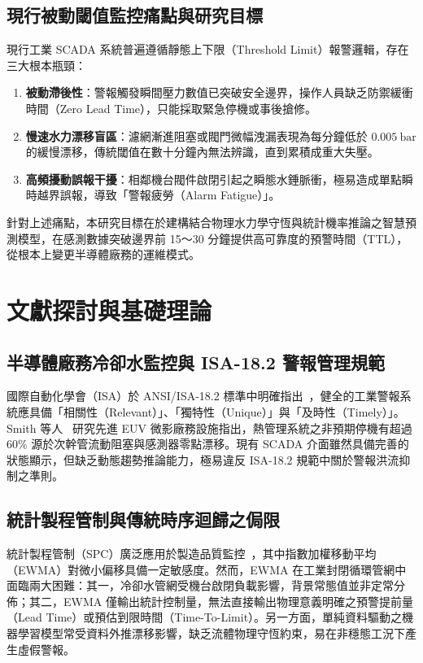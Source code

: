 \documentclass[fontset=none, a4paper, 12pt]{ctexart}
\begin{document}
\begin{doublespace}
\subsection{現行被動閾值監控痛點與研究目標}
現行工業 SCADA 系統普遍遵循靜態上下限（Threshold Limit）報警邏輯，存在三大根本瓶頸：
\begin{enumerate}
    \item \textbf{被動滯後性}：警報觸發瞬間壓力數值已突破安全邊界，操作人員缺乏防禦緩衝時間（Zero Lead Time），只能採取緊急停機或事後搶修。
    \item \textbf{慢速水力漂移盲區}：濾網漸進阻塞或閥門微幅洩漏表現為每分鐘低於 $0.005\ \mathrm{bar}$ 的緩慢漂移，傳統閾值在數十分鐘內無法辨識，直到累積成重大失壓。
    \item \textbf{高頻擾動誤報干擾}：相鄰機台閥件啟閉引起之瞬態水錘脈衝，極易造成單點瞬時越界誤報，導致「警報疲勞（Alarm Fatigue）」。
\end{enumerate}
針對上述痛點，本研究目標在於建構結合物理水力學守恆與統計機率推論之智慧預測模型，在感測數據突破邊界前 15～30 分鐘提供高可靠度的預警時間（TTL），從根本上變更半導體廠務的運維模式。

\clearpage
\section{文獻探討與基礎理論}

\subsection{半導體廠務冷卻水監控與 ISA-18.2 警報管理規範}
國際自動化學會（ISA）於 ANSI/ISA-18.2 標準中明確指出~\cite{isa1822016}，健全的工業警報系統應具備「相關性（Relevant）」、「獨特性（Unique）」與「及時性（Timely）」。Smith 等人~\cite{smith2021facility} 研究先進 EUV 微影廠務設施指出，熱管理系統之非預期停機有超過 60\% 源於次幹管流動阻塞與感測器零點漂移。現有 SCADA 介面雖然具備完善的狀態顯示，但缺乏動態趨勢推論能力，極易違反 ISA-18.2 規範中關於警報洪流抑制之準則。

\subsection{統計製程管制與傳統時序迴歸之侷限}
統計製程管制（SPC）廣泛應用於製造品質監控~\cite{montgomery2020statistical}，其中指數加權移動平均（EWMA）對微小偏移具備一定敏感度。然而，EWMA 在工業封閉循環管網中面臨兩大困難：其一，冷卻水管網受機台啟閉負載影響，背景常態值並非定常分佈；其二，EWMA 僅輸出統計控制量，無法直接輸出物理意義明確之預警提前量（Lead Time）或預估到限時間（Time-To-Limit）。另一方面，單純資料驅動之機器學習模型常受資料外推漂移影響，缺乏流體物理守恆約束，易在非穩態工況下產生虛假警報。


\end{doublespace}
\end{document}
